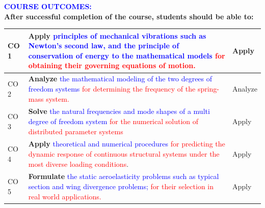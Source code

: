 \documentclass[11pt,paper=a4,answers]{exam}
\begin{document}
\flushleft\textbf{\textcolor{blue}{\large COURSE OUTCOMES:}}\\


\textbf{After successful completion of the course, students should be able to:}\\
\renewcommand{\arraystretch}{1.1}\vspace{-0.75cm}
\begin{flushleft}
	\begin{longtable}{|C{1.5cm}|R{12.5cm}|C{1.5cm}|}
		\hline
		CO 1 &	\textbf{Apply} \textcolor{blue}{ principles of mechanical vibrations such as Newton’s second law, and
			the principle of conservation of energy to the mathematical models  } \textcolor{red}{for obtaining
			their governing equations of motion.}&Apply\tabularnewline
		\hline
		CO 2&	\textbf{Analyze} \textcolor{blue}{   the mathematical modeling of the two degrees of
			freedom systems} \textcolor{red}{ for determining the frequency of the spring-mass system.}&	Analyze\tabularnewline
		\hline
		CO 3&	\textbf{Solve} \textcolor{blue}{ the natural frequencies and mode shapes of a multi
			degree of freedom system } \textcolor{red}{for the numerical solution of distributed parameter systems}&	Apply\tabularnewline
		\hline 
		
		CO 4&	\textbf{Apply} \textcolor{blue}{  theoretical and numerical procedures } \textcolor{red}{for predicting the dynamic response of  continuous structural systems under the most diverse loading conditions}.	&Apply\tabularnewline
		\hline		
		CO 5&\textbf{Formulate } \textcolor{blue}{ the static aeroelasticity problems such as typical section and wing divergence
			problems; }\textcolor{red}{ for their selection in real world
			applications.}	&	Apply\tabularnewline
		
		
		\hline
	\end{longtable}
\end{flushleft}
\end{document}
